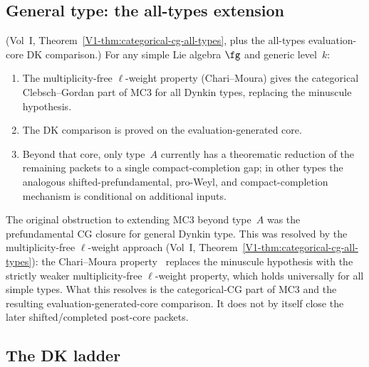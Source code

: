 \subsection{General type: the all-types extension}

\begin{theorem}
\textup{(Vol~I, Theorem~\ref*{V1-thm:categorical-cg-all-types},
plus the all-types evaluation-core DK comparison.)}
For any simple Lie algebra $\fg$ and generic level~$k$:
\begin{enumerate}[label=(\roman*)]
\item The multiplicity-free $\ell$-weight property
 (Chari--Moura) gives the categorical Clebsch--Gordan part of
 MC3 for all Dynkin types, replacing the minuscule hypothesis.
\item The DK comparison is proved on the evaluation-generated core.
\item Beyond that core, only type~$A$ currently has a theorematic
 reduction of the remaining packets to a single compact-completion
 gap; in other types the analogous shifted-prefundamental,
 pro-Weyl, and compact-completion mechanism is conditional on
 additional inputs.
\end{enumerate}
\end{theorem}

\begin{remark}
The original obstruction to extending MC3 beyond type~$A$ was the
prefundamental CG closure for general Dynkin type. This was
resolved by the multiplicity-free $\ell$-weight approach
(Vol~I, Theorem~\ref*{V1-thm:categorical-cg-all-types}): the
Chari--Moura property~\cite{ChariMoura06} replaces the minuscule
hypothesis with the strictly weaker multiplicity-free $\ell$-weight
property, which holds universally for all simple types. What this
resolves is the categorical-CG part of MC3 and the resulting
evaluation-generated-core comparison. It does not by itself close the
later shifted/completed post-core packets.
\end{remark}

\subsection{The DK ladder}

